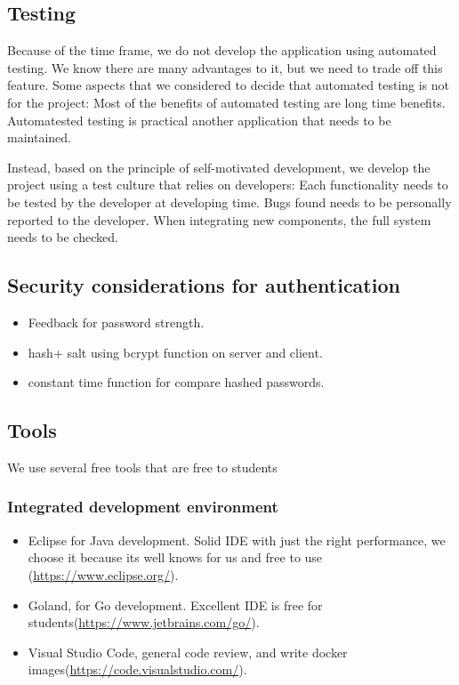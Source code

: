 \subsection{ Testing}
\indent
\indent
Because of the time frame, we do not develop the application using automated testing. We know there are many advantages to it, but we need to trade off this feature. Some aspects that we considered to decide that automated testing is not for the project:
Most of the benefits of automated testing are long time benefits.
Automatested testing is practical another application that needs to be maintained.

Instead, based on the principle of self-motivated development, we develop the project using a test culture that relies on developers:
Each functionality needs to be tested by the developer at developing time.
Bugs found needs to be personally reported to the developer.
When integrating new components, the full system needs to be checked. 

\subsection{Security considerations for authentication}
\begin{itemize}

	\item  Feedback for password strength.
	\item  hash+ salt using bcrypt function on server and client.
	\item constant time function for compare hashed passwords.
\end{itemize}
\subsection{Tools}

We use several free tools that are free to students

\subsubsection{Integrated development environment}

\begin{itemize}

	\item  Eclipse for Java development. Solid IDE with just the right performance, we choose it because its well knows for us and free to use (\url{https://www.eclipse.org/}).
	\item  Goland, for Go development. Excellent IDE is free for students(\url{https://www.jetbrains.com/go/}). 
	\item  Visual Studio Code, general code review, and write docker images(\url{https://code.visualstudio.com/}).

\end{itemize}
